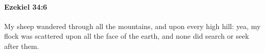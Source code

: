 
		\paragraph{Ezekiel 34:6} %
			\label{EZEKIEL-34-6}

			My sheep wandered through all the mountains, and upon every high hill: yea, my flock was scattered upon all the face of the earth, and none did search or seek after them.


